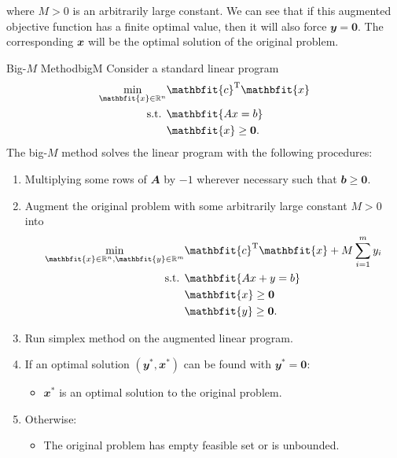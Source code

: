 \documentclass[math, code]{amznotes}
\theoremstyle{remark}
\begin{document}
where $M > 0$ is an arbitrarily large constant. We can see that if this augmented objective function has a finite optimal value, then it will also force $\mathbfit{y} = \mathbf{0}$. The corresponding $\mathbfit{x}$ will be the optimal solution of the original problem.
\begin{tecbox}{Big-$M$ Method}{bigM}
    Consider a standard linear program
    \begin{align*}
        \min_{\mathbfit{x} \in \R^n} & \mathbfit{c}^{\mathrm{T}}\mathbfit{x} \\
        \textrm{s.t. } & \mathbfit{Ax = b} \\
        & \mathbfit{x} \geq \mathbf{0}.
    \end{align*}
    The big-$M$ method solves the linear program with the following procedures:
    \begin{enumerate}
        \item Multiplying some rows of $\mathbfit{A}$ by $-1$ wherever necessary such that $\mathbfit{b} \geq \mathbf{0}$.
        \item Augment the original problem with some arbitrarily large constant $M > 0$ into
        \begin{align*}
            \min_{\mathbfit{x} \in \R^n, \mathbfit{y} \in \R^m} & \mathbfit{c}^{\mathrm{T}}\mathbfit{x} + M\sum_{i = 1}^{m}y_i \\
            \textrm{s.t. } & \mathbfit{Ax + y = b} \\
            & \mathbfit{x} \geq \mathbf{0} \\
            & \mathbfit{y} \geq \mathbf{0}.
        \end{align*}
        \item Run simplex method on the augmented linear program.
        \item If an optimal solution $\left(\mathbfit{y}^*, \mathbfit{x}^*\right)$ can be found with $\mathbfit{y}^* = \mathbf{0}$:
        \begin{itemize}
            \item $\mathbfit{x}^*$ is an optimal solution to the original problem.
        \end{itemize}
        \item Otherwise:
        \begin{itemize}
            \item The original problem has empty feasible set or is unbounded.
        \end{itemize}
    \end{enumerate} 
\end{tecbox}
\end{document}
